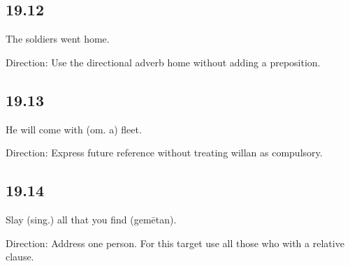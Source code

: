 \subsection*{19.12}

\par\begin{minipage}{\linewidth}\raggedright
The soldiers went home.

Direction: Use the directional adverb home without adding a preposition.

\end{minipage}\par\addvspace{4pt}

\subsection*{19.13}

\par\begin{minipage}{\linewidth}\raggedright
He will come with (om. a) fleet.

Direction: Express future reference without treating willan as compulsory.

\end{minipage}\par\addvspace{4pt}

\subsection*{19.14}

\par\begin{minipage}{\linewidth}\raggedright
Slay (sing.) all that you find (gemētan).

Direction: Address one person. For this target use all those who with a relative clause.

\end{minipage}\par\addvspace{4pt}

